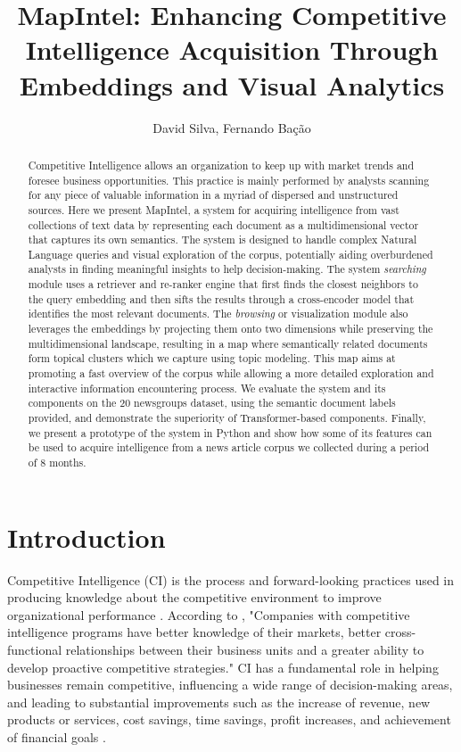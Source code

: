\documentclass[a4paper]{article}
\title{MapIntel: Enhancing Competitive Intelligence Acquisition Through Embeddings and Visual Analytics}
\author{David Silva, Fernando Bação}
\date{}
\begin{document}
\maketitle

\begin{abstract}
	Competitive Intelligence allows an organization to keep up with market trends and foresee business opportunities. This practice is mainly performed by analysts scanning for any piece of valuable information in a myriad of dispersed and unstructured sources. Here we present MapIntel, a system for acquiring intelligence from vast collections of text data by representing each document as a multidimensional vector that captures its own semantics. The system is designed to handle complex Natural Language queries and visual exploration of the corpus, potentially aiding overburdened analysts in finding meaningful insights to help decision-making. The system \emph{searching} module uses a retriever and re-ranker engine that first finds the closest neighbors to the query embedding and then sifts the results through a cross-encoder model that identifies the most relevant documents. The \emph{browsing} or visualization module also leverages the embeddings by projecting them onto two dimensions while preserving the multidimensional landscape, resulting in a map where semantically related documents form topical clusters which we capture using topic modeling. This map aims at promoting a fast overview of the corpus while allowing a more detailed exploration and interactive information encountering process. We evaluate the system and its components on the 20 newsgroups dataset, using the semantic document labels provided, and demonstrate the superiority of Transformer-based components. Finally, we present a prototype of the system in Python and show how some of its features can be used to acquire intelligence from a news article corpus we collected during a period of 8 months.
\end{abstract}

\section{Introduction}
Competitive Intelligence (CI) is the process and forward-looking practices used in producing knowledge about the competitive environment to improve organizational performance \citep{madureira2021}. According to \citet{brod1999}, "Companies with competitive intelligence programs have better knowledge of their markets, better cross-functional relationships between their business units and a greater ability to develop proactive competitive strategies." CI has a fundamental role in helping businesses remain competitive, influencing a wide range of decision-making areas, and leading to substantial improvements such as the increase of revenue, new products or services, cost savings, time savings, profit increases, and achievement of financial goals \citep{calof2017}.
\end{document}
